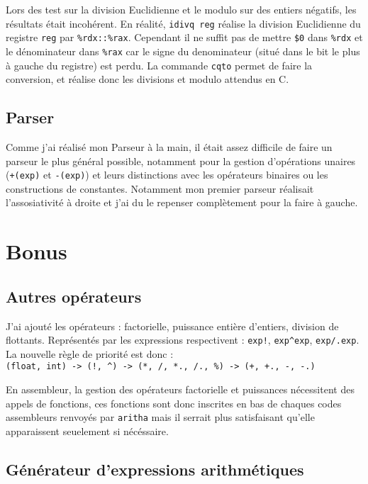 \documentclass[11pt,a4paper]{article}
\begin{document}
Lors des test sur la division Euclidienne et le modulo sur des entiers négatifs, les résultats était incohérent. En réalité, \verb|idivq reg| réalise la division Euclidienne du registre \verb|reg| par \verb|%rdx::%rax|. Cependant il ne suffit pas de mettre \verb|$0| dans \verb|%rdx| et le dénominateur dans \verb|%rax| car le signe du denominateur (situé dans le bit le plus à gauche du registre) est perdu. La commande \verb|cqto| permet de faire la conversion, et réalise donc les divisions et modulo attendus en C.

\subsection{Parser}

Comme j'ai réalisé mon Parseur à la main, il était assez difficile de faire un parseur le plus général possible, notamment pour la gestion d'opérations unaires (\verb|+(exp)| et \verb|-(exp)|) et leurs distinctions avec les opérateurs binaires ou les constructions de constantes. Notamment mon premier parseur réalisait l'assosiativité à droite et j'ai du le repenser complètement pour la faire à gauche.

\section{Bonus}

\subsection{Autres opérateurs}

J'ai ajouté les opérateurs : factorielle, puissance entière d'entiers, division de flottants. Représentés par les expressions respectivent : \verb|exp!|, \verb|exp^exp|, \verb|exp/.exp|. La nouvelle règle de priorité est donc :\\
\verb|(float, int) -> (!, ^) -> (*, /, *., /., %) -> (+, +., -, -.)|

En assembleur, la gestion des opérateurs factorielle et puissances nécessitent des appels de fonctions, ces fonctions sont donc inscrites en bas de chaques codes assembleurs renvoyés par \verb|aritha| mais il serrait plus satisfaisant qu'elle apparaissent seuelement si nécéssaire.

\subsection{Générateur d'expressions arithmétiques}
\end{document}
